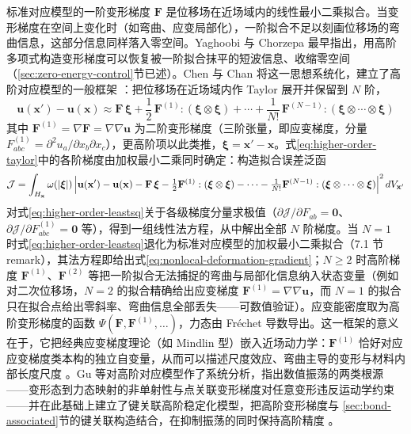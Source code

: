 标准对应模型的一阶变形梯度 $\mathbf{F}$ 是位移场在近场域内的线性最小二乘拟合。当变形梯度在空间上变化时（如弯曲、应变局部化），一阶拟合不足以刻画位移场的弯曲信息，这部分信息同样落入零空间。Yaghoobi 与 Chorzepa 最早指出，用高阶多项式构造变形梯度可以恢复被一阶拟合抹平的短波信息、收缩零空间 \cite{YaghoobiChorzepa2017}（\ref{sec:zero-energy-control}节已述）。Chen 与 Chan 将这一思想系统化，建立了高阶对应模型的一般框架 \cite{ChenChan2020}：把位移场在近场域内作 Taylor 展开并保留到 $N$ 阶，
\begin{equation}
  \mathbf{u}(\mathbf{x}')-\mathbf{u}(\mathbf{x})
  \approx\mathbf{F}\,\boldsymbol{\xi}
  +\frac{1}{2}\,\mathbf{F}^{(1)}:(\boldsymbol{\xi}\otimes\boldsymbol{\xi})
  +\cdots+\frac{1}{N!}\,\mathbf{F}^{(N-1)}:(\boldsymbol{\xi}\otimes\cdots\otimes\boldsymbol{\xi})
  \label{eq:higher-order-taylor}
\end{equation}
其中 $\mathbf{F}^{(1)}=\nabla\mathbf{F}=\nabla\nabla\mathbf{u}$ 为二阶变形梯度（三阶张量，即应变梯度，分量 $F^{(1)}_{abc}=\partial^{2}u_{a}/\partial x_{b}\partial x_{c}$），更高阶项以此类推，$\boldsymbol{\xi}=\mathbf{x}'-\mathbf{x}$。式\eqref{eq:higher-order-taylor}中的各阶梯度由加权最小二乘同时确定：构造拟合误差泛函
\begin{equation}
  \mathcal{J}=\int_{H_{\mathbf{x}}}\omega(|\boldsymbol{\xi}|)\,
  \Bigl\lvert\mathbf{u}(\mathbf{x}')-\mathbf{u}(\mathbf{x})
  -\mathbf{F}\,\boldsymbol{\xi}
  -\tfrac{1}{2}\mathbf{F}^{(1)}:(\boldsymbol{\xi}\otimes\boldsymbol{\xi})
  -\cdots-\tfrac{1}{N!}\mathbf{F}^{(N-1)}:(\boldsymbol{\xi}\otimes\cdots\otimes\boldsymbol{\xi})\Bigr\rvert^{2}\,dV_{\mathbf{x}'}
  \label{eq:higher-order-leastsq}
\end{equation}
对式\eqref{eq:higher-order-leastsq}关于各级梯度分量求极值（$\partial\mathcal{J}/\partial F_{ab}=\mathbf{0}$、$\partial\mathcal{J}/\partial F^{(1)}_{abc}=\mathbf{0}$ 等），得到一组线性法方程，从中解出全部 $N$ 阶梯度。当 $N=1$ 时式\eqref{eq:higher-order-leastsq}退化为标准对应模型的加权最小二乘拟合（7.1 节 remark），其法方程即给出式\eqref{eq:nonlocal-deformation-gradient}；$N\ge2$ 时高阶梯度 $\mathbf{F}^{(1)}$、$\mathbf{F}^{(2)}$ 等把一阶拟合无法捕捉的弯曲与局部化信息纳入状态变量（例如对二次位移场，$N=2$ 的拟合精确给出应变梯度 $\mathbf{F}^{(1)}=\nabla\nabla\mathbf{u}$，而 $N=1$ 的拟合只在拟合点给出零斜率、弯曲信息全部丢失——可数值验证）。应变能密度取为高阶变形梯度的函数 $\Psi(\mathbf{F},\mathbf{F}^{(1)},\ldots)$，力态由 Fréchet 导数导出。这一框架的意义在于，它把经典应变梯度理论（如 Mindlin 型）嵌入近场动力学：$\mathbf{F}^{(1)}$ 恰好对应应变梯度类本构的独立自变量，从而可以描述尺度效应、弯曲主导的变形与材料内部长度尺度 \cite{ChenChan2020}。Gu 等对高阶对应模型作了系统分析，指出数值振荡的两类根源——变形态到力态映射的非单射性与点关联变形梯度对任意变形违反运动学约束——并在此基础上建立了键关联高阶稳定化模型，把高阶变形梯度与 \ref{sec:bond-associated}节的键关联构造结合，在抑制振荡的同时保持高阶精度 \cite{GuZhangMadenciXia2019,GuMadenciZhang2018}。

